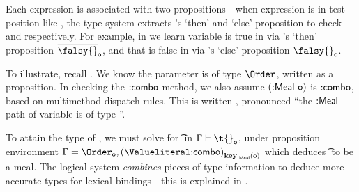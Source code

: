 Each expression is associated with two propositions---when expression
 is in test position like
,
the type system extracts 's `then' and `else' proposition to check
 and  respectively.
For example, in 
we learn variable {} is true in  via {}'s `then' proposition $\notprop{\falsy{}}{\makelocal{o}}$, and 
that {} is false in  via {}'s `else' proposition $\isprop{\falsy{}}{\makelocal{o}}$.

To illustrate, recall .
We know the parameter  is of type $\Order$,
written
{}
as a proposition.
%
In checking the ${{\mathsf{\mathbin{:}combo}}}$ method, we also assume
${({\mathsf{\mathbin{:}Meal}}\ {\mathsf{o}})}$ is ${{\mathsf{\mathbin{:}combo}}}$,
based on multimethod dispatch rules. This is written
  {},
pronounced ``the ${{\mathsf{\mathbin{:}Meal}}}$ path of variable  is of type
{}''.

To attain the type of , 
we must solve for \t{} in
$
{ \inpropenv 
  {\propenv{}}
  {\isprop {\t{}} {\makelocal{o}}}}
$,
under proposition environment
$
\propenv{} = {{\isprop{\Order}{\makelocal{o}}},
    {\isprop{\Value{\makekw{combo}}}{\path{\keype{\makekw{Meal}}}{\makelocal{o}}}}}
$
which deduces \t{} to be a {} meal.
The logical
system \emph{combines} pieces of type information to deduce more accurate types for lexical
bindings---this is explained in .

%






